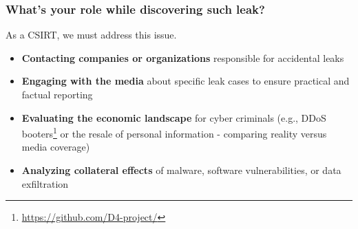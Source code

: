 \documentclass[aspectratio=169]{beamer}
\begin{document}
\begin{frame}
    \frametitle{What's your role while discovering such leak?}
    \begin{center}
        \large{As a CSIRT, we must address this issue.}
    \end{center}
    \vspace{0.5cm}

    \begin{itemize}
        \item \textbf{Contacting companies or organizations} responsible for accidental leaks
        \item \textbf{Engaging with the media} about specific leak cases to ensure practical and factual reporting
        \item \textbf{Evaluating the economic landscape} for cyber criminals (e.g., DDoS booters\footnote{\url{https://github.com/D4-project/}} or the resale of personal information - comparing reality versus media coverage)
        \item \textbf{Analyzing collateral effects} of malware, software vulnerabilities, or data exfiltration
    \end{itemize}

\end{frame}
\end{document}
